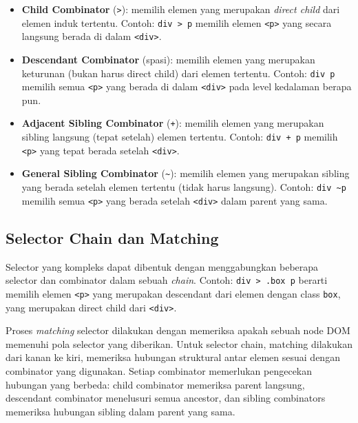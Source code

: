 \begin{itemize}
    \item \textbf{Child Combinator} (\texttt{>}): memilih elemen yang merupakan
    \textit{direct child} dari elemen induk tertentu. Contoh: \texttt{div > p}
    memilih elemen \texttt{<p>} yang secara langsung berada di dalam \texttt{<div>}.
    
    \item \textbf{Descendant Combinator} (spasi): memilih elemen yang merupakan
    keturunan (bukan harus direct child) dari elemen tertentu. Contoh:
    \texttt{div p} memilih semua \texttt{<p>} yang berada di dalam \texttt{<div>}
    pada level kedalaman berapa pun.
    
    \item \textbf{Adjacent Sibling Combinator} (\texttt{+}): memilih elemen
    yang merupakan sibling langsung (tepat setelah) elemen tertentu. Contoh:
    \texttt{div + p} memilih \texttt{<p>} yang tepat berada setelah \texttt{<div>}.
    
    \item \textbf{General Sibling Combinator} (\texttt{\textasciitilde}): memilih
    elemen yang merupakan sibling yang berada setelah elemen tertentu (tidak harus
    langsung). Contoh: \texttt{div \textasciitilde p} memilih semua \texttt{<p>}
    yang berada setelah \texttt{<div>} dalam parent yang sama.
\end{itemize}

\subsection{Selector Chain dan Matching}

Selector yang kompleks dapat dibentuk dengan menggabungkan beberapa selector
dan combinator dalam sebuah \textit{chain}. Contoh: \texttt{div > .box p}
berarti memilih elemen \texttt{<p>} yang merupakan descendant dari elemen dengan
class \texttt{box}, yang merupakan direct child dari \texttt{<div>}.

Proses \textit{matching} selector dilakukan dengan memeriksa apakah sebuah node
DOM memenuhi pola selector yang diberikan. Untuk selector chain, matching
dilakukan dari kanan ke kiri, memeriksa hubungan struktural antar elemen sesuai
dengan combinator yang digunakan. Setiap combinator memerlukan pengecekan
hubungan yang berbeda: child combinator memeriksa parent langsung, descendant
combinator menelusuri semua ancestor, dan sibling combinators memeriksa hubungan
sibling dalam parent yang sama.


